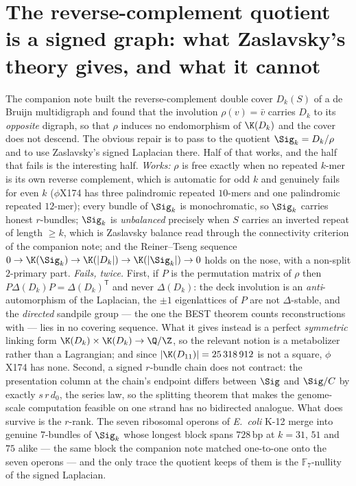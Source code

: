 \chapter{The reverse-complement quotient is a signed graph: what Zaslavsky's theory gives, and what it cannot}\label{chap:Bio7}
\begin{chapterabstract}
\noindent
The companion note built the reverse-complement double cover $D_k(S)$ of a de Bruijn
multidigraph and found that the involution $\rho(v)=\bar v$ carries $D_k$ to its
\emph{opposite} digraph, so that $\rho$ induces no endomorphism of $\K(D_k)$ and the cover
does not descend. The obvious repair is to pass to the quotient $\Sig_k=D_k/\rho$ and to use
Zaslavsky's signed Laplacian there. Half of that works, and the half that fails is the
interesting half. \emph{Works:} $\rho$ is free exactly when no repeated $k$-mer is its own
reverse complement, which is automatic for odd $k$ and genuinely fails for even $k$
($\phi$X174 has three palindromic repeated $10$-mers and one palindromic repeated $12$-mer);
every bundle of $\Sig_k$ is monochromatic, so $\Sig_k$ carries honest $r$-bundles; $\Sig_k$
is \emph{unbalanced} precisely when $S$ carries an inverted repeat of length $\ge k$, which
is Zaslavsky balance read through the connectivity criterion of the companion note; and the
Reiner--Tseng sequence
$0\to\K(\Sig_k)\to\K(|D_k|)\to\K(|\Sig_k|)\to 0$
holds on the nose, with a non-split $2$-primary part.
\emph{Fails, twice.} First, if $P$ is the permutation matrix of $\rho$ then
$P\Delta(D_k)P=\Delta(D_k)^{\mathsf T}$ and never $\Delta(D_k)$: the deck involution is an
\emph{anti}-automorphism of the Laplacian, the $\pm1$ eigenlattices of $P$ are not
$\Delta$-stable, and the \emph{directed} sandpile group --- the one the BEST theorem counts
reconstructions with --- lies in no covering sequence. What it gives instead is a perfect
\emph{symmetric} linking form $\K(D_k)\times\K(D_k)\to\Q/\Z$, so the relevant notion is a
metabolizer rather than a Lagrangian; and since $|\K(D_{11})|=25\,318\,912$ is not a square,
$\phi$X174 has none. Second, a signed $r$-bundle chain does
not contract: the presentation column at the chain's endpoint differs between $\Sig$ and
$\Sig/C$ by exactly $s\,r\,d_0$, the series law, so the splitting theorem that makes the
genome-scale computation feasible on one strand has no bidirected analogue. What does survive
is the $r$-rank. The seven ribosomal operons of \emph{E.\ coli} K-12 merge into genuine
$7$-bundles of $\Sig_k$ whose longest block spans $728$\,bp at $k=31$, $51$ and $75$ alike ---
the same block the companion note matched one-to-one onto the seven operons --- and the only
trace the quotient keeps of them is the $\mathbb{F}_7$-nullity of the signed Laplacian.
\end{chapterabstract}

